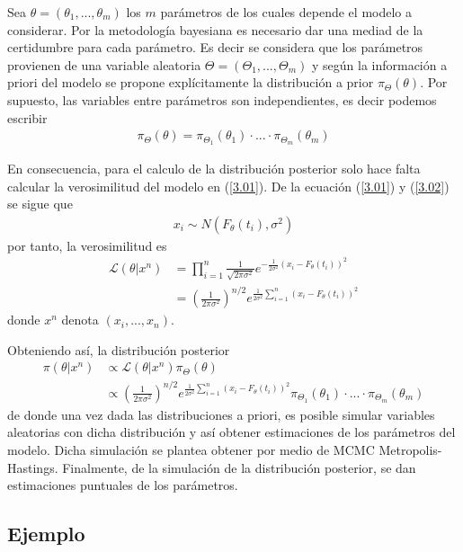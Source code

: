 \documentclass{article}
\begin{document}
Sea $\theta = (\theta_1, ...,\theta_m)$ los $m$ parámetros de los cuales depende el modelo a considerar. Por la metodología bayesiana es necesario dar una mediad de la certidumbre para cada parámetro. Es decir se considera que los parámetros provienen de una variable aleatoria $\Theta = (\Theta_1, ..., \Theta_m)$ y según la información a priori del modelo se propone explícitamente la distribución a prior $\pi_{\Theta}(\theta)$. Por supuesto, las variables entre parámetros son independientes, es decir podemos escribir
\begin{align*}
    \pi_{\Theta}(\theta) = \pi_{\Theta_1}(\theta_1) \cdot ... \cdot \pi_{\Theta_m}(\theta_m)
\end{align*}

En consecuencia, para el calculo de la distribución posterior solo hace falta calcular la verosimilitud del modelo en (\ref{3.01}). De la ecuación (\ref{3.01}) y (\ref{3.02}) se sigue que
\begin{align*}
    x_i \sim N(F_\theta(t_i), \sigma^2)
\end{align*}
por tanto, la verosimilitud es
\begin{align*}
    \mathcal{L}(\theta|x^n) &= \prod_{i=1}^n \frac{1}{\sqrt{2\pi \sigma^2}} e^{-\frac{1}{2\sigma^2}\left(x_i - F_{\theta}(t_i)\right)^2 } \\
    &= \left(\frac{1}{2\pi\sigma^2}\right)^{n/2} e^{\frac{1}{2\sigma^2} \sum_{i =1}^{n}\left(x_i - F_{\theta}(t_i)\right) ^2} 
\end{align*}
donde $x^n$ denota $(x_i,..., x_n)$.


Obteniendo así, la distribución posterior 
\begin{align*}
    \pi(\theta|x^n) &\propto \mathcal{L}(\theta|x^n) \pi_{\Theta}(\theta)\\
    & \propto \left(\frac{1}{2\pi\sigma^2}\right)^{n/2} e^{\frac{1}{2\sigma^2} \sum_{i =1}^{n}\left(x_i - F_{\theta}(t_i)\right) ^2} \pi_{\Theta_1}(\theta_1) \cdot ... \cdot \pi_{\Theta_m}(\theta_m)
\end{align*}
de donde una vez dada las distribuciones a priori, es posible simular variables aleatorias con dicha distribución y así obtener estimaciones de los parámetros del modelo. Dicha simulación se plantea obtener por medio de MCMC Metropolis-Hastings. Finalmente, de la simulación de la distribución posterior, se dan estimaciones puntuales de los parámetros.

\subsection{Ejemplo}
\end{document}
